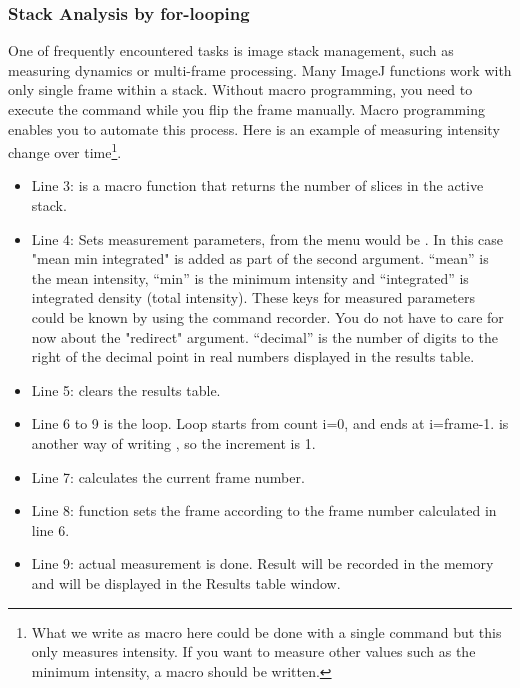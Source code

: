 \subsubsection{Stack Analysis by for-looping}
\label{sec:forloopStack}
One of frequently encountered tasks is image stack management, 
such as measuring dynamics or multi-frame processing. 
Many ImageJ functions work with only single frame within a stack. 
Without macro programming, you need to execute the command while you flip the frame manually. 
Macro programming enables you to automate this process. 
Here is an example of measuring intensity change over time\footnote{What we write as macro here could be done with a single command  but this only measures intensity. If you want to measure other values such as the minimum intensity, a macro should be written. }. 

\begin{itemize}
\item Line 3:  is a macro function that returns the number of slices in the active stack. 

\item Line 4: Sets measurement parameters, from the menu would be . In this case "mean min integrated" is added as part of the second argument. ``mean'' is the mean intensity, ``min'' is the minimum intensity and ``integrated'' is integrated density (total intensity). These keys for measured parameters could be known by using the command recorder. 
You do not have to care for now about the "redirect" argument. ``decimal'' is the number of digits to 
the right of the decimal point in real numbers displayed in the results table. 

\item Line 5: clears the results table. 

\item Line 6 to 9 is the loop. Loop starts from count i=0, and ends at i=frame-1.  is another way of writing , so the increment is 1.  

\item Line 7: calculates the current frame number. 

\item Line 8:  function sets the frame according to the frame number calculated in line 6. 

\item Line 9:  actual measurement is done. 
Result will be recorded in the memory and will be displayed in the Results table window. 
\end{itemize}

